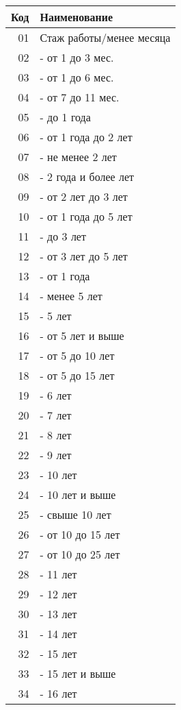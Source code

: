 \documentclass[10pt, a4paper, titlepage]{article}
\begin{document}
\begin{center}
    \begin{longtable}{rp{}}
        \hline
        \textbf{Код} & \textbf{Наименование} \\ \hline
        01 & Стаж работы/менее месяца \\
        02 & - от 1 до 3 мес. \\
        03 & - от 1 до 6 мес. \\
        04 & - от 7 до 11 мес. \\
        05 & - до 1 года \\
        06 & - от 1 года до 2 лет \\
        07 & - не менее 2 лет \\
        08 & - 2 года и более лет \\
        09 & - от 2 лет до 3 лет \\
        10 & - от 1 года до 5 лет \\
        11 & - до 3 лет \\
        12 & - от 3 лет до 5 лет \\
        13 & - от 1 года \\
        14 & - менее 5 лет \\
        15 & - 5 лет \\
        16 & - от 5 лет и выше \\
        17 & - от 5 до 10 лет \\
        18 & - от 5 до 15 лет \\
        19 & - 6 лет \\
        20 & - 7 лет \\
        21 & - 8 лет \\
        22 & - 9 лет \\
        23 & - 10 лет \\
        24 & - 10 лет и выше \\
        25 & - свыше 10 лет \\
        26 & - от 10 до 15 лет \\
        27 & - от 10 до 25 лет \\
        28 & - 11 лет \\
        29 & - 12 лет \\
        30 & - 13 лет \\
        31 & - 14 лет \\
        32 & - 15 лет \\
        33 & - 15 лет и выше \\
        34 & - 16 лет \\

\end{longtable}
\end{center}
\end{document}
